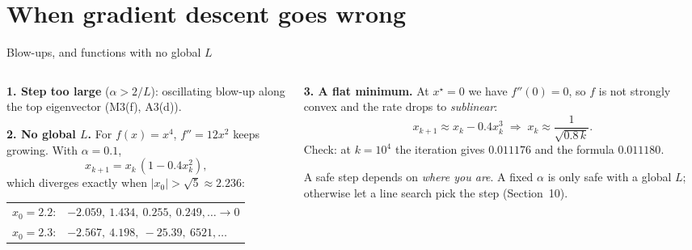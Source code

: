 \section{When gradient descent goes wrong}

\begin{frame}{Blow-ups, and functions with no global $L$}
  \begin{columns}[T]
    \begin{column}{0.5\textwidth}
      \textbf{1. Step too large} ($\alpha>2/L$): oscillating blow-up along the top eigenvector (M3(f), A3(d)).

      \vspace{4pt}
      \textbf{2. No global $L$.} For $f(x) = x^4$, $f'' = 12x^2$ keeps growing. With $\alpha = 0.1$,
      \[
        x_{k+1} = x_k\,(1 - 0.4x_k^2),
      \]
      which diverges exactly when $|x_0|>\sqrt5\approx2.236$:

      \vspace{2pt}
      \footnotesize
      \begin{tabular}{@{}l l@{}}
        $x_0 = 2.2$: & $-2.059,\ 1.434,\ 0.255,\ 0.249,\dots\to0$\\
        $x_0 = 2.3$: & $-2.567,\ 4.198,\ -25.39,\ 6521,\dots$
      \end{tabular}
    \end{column}
    \begin{column}{0.48\textwidth}
      \textbf{3. A flat minimum.} At $x^\star = 0$ we have $f''(0) = 0$, so $f$ is not strongly convex and the rate
      drops to \emph{sublinear}:
      \[
        x_{k+1}\approx x_k - 0.4x_k^3 \;\Rightarrow\; x_k\approx\frac{1}{\sqrt{0.8\,k}} .
      \]
      \footnotesize Check: at $k = 10^4$ the iteration gives $0.011176$ and the formula $0.011180$.

      \vspace{4pt}
      \begin{warnbox}[Lesson]
        \small A safe step depends on \emph{where you are}. A fixed $\alpha$ is only safe with a global $L$;
        otherwise let a line search pick the step (Section~10).
      \end{warnbox}
    \end{column}
  \end{columns}
\end{frame}


